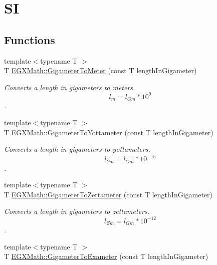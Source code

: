 \hypertarget{group___e_g_x_math-_conversions-_length_conversions-_s_i-_gigameter-_s_i}{}\section{SI}
\label{group___e_g_x_math-_conversions-_length_conversions-_s_i-_gigameter-_s_i}
\subsection*{Functions}
\begin{DoxyCompactItemize}
\item 
{\footnotesize template$<$typename T $>$ }\\T \mbox{\hyperlink{group___e_g_x_math-_conversions-_length_conversions-_s_i-_gigameter-_s_i_ga9573f9c296bf9043de80f6f6b13c0aa9}{E\+G\+X\+Math\+::\+Gigameter\+To\+Meter}} (const T length\+In\+Gigameter)
\begin{DoxyCompactList}\small\item\em Converts a length in gigameters to meters. \[ l_{m}=l_{Gm} * 10^{9}\]. \end{DoxyCompactList}\item 
{\footnotesize template$<$typename T $>$ }\\T \mbox{\hyperlink{group___e_g_x_math-_conversions-_length_conversions-_s_i-_gigameter-_s_i_ga311d6ae40f97487de660c9fb0310ec5e}{E\+G\+X\+Math\+::\+Gigameter\+To\+Yottameter}} (const T length\+In\+Gigameter)
\begin{DoxyCompactList}\small\item\em Converts a length in gigameters to yottameters. \[ l_{Ym}=l_{Gm} * 10^{-15} \]. \end{DoxyCompactList}\item 
{\footnotesize template$<$typename T $>$ }\\T \mbox{\hyperlink{group___e_g_x_math-_conversions-_length_conversions-_s_i-_gigameter-_s_i_gaaaefaf67b876bfdeccd8176508e765e3}{E\+G\+X\+Math\+::\+Gigameter\+To\+Zettameter}} (const T length\+In\+Gigameter)
\begin{DoxyCompactList}\small\item\em Converts a length in gigameters to zettameters. \[ l_{Zm}=l_{Gm} * 10^{-12} \]. \end{DoxyCompactList}\item 
{\footnotesize template$<$typename T $>$ }\\T \mbox{\hyperlink{group___e_g_x_math-_conversions-_length_conversions-_s_i-_gigameter-_s_i_ga38ebe6bd7f8d4dd09cadc8d08caf90eb}{E\+G\+X\+Math\+::\+Gigameter\+To\+Exameter}} (const T length\+In\+Gigameter)

\end{DoxyCompactItemize}
